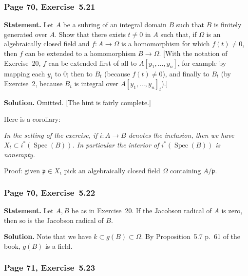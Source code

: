 \documentclass[12pt,letterpaper]{article}%
\newcommand{\oo}{\operatorname}\newcommand{\ooo}{\operatorname*}
\newcommand{\mf}{\mathfrak}
\newcommand{\mmm}{\mf m}
\newcommand{\ppp}{\mf p}
\newcommand{\Spec}{\operatorname{Spec}}\newcommand{\Sp}{\operatorname{Spec}}
\newcommand{\nn}{\noindent}
\begin{document}
\subsubsection{Page 70, Exercise~5.21}\label{ex5.21}%

\textbf{Statement.} Let $A$ be a subring of an integral domain $B$ such that $B$ is finitely generated over $A$. Show that there exists $t\ne0$ in $A$ such that, if $\Omega$ is an algebraically closed field and $f:A\to\Omega$ is a homomorphism for which $f(t)\ne0$, then $f$ can be extended to a homomorphism $B\to\Omega$. [With the notation of Exercise~20, $f$ can be extended first of all to $A[y_1,\ldots,y_n]$, for example by mapping each $y_i$ to $0$; then to $B_t$ (because $f(t)\ne0$), and finally to $B_t$ (by Exercise~2, because $B_t$ is integral over $A[y_1,\ldots,y_n]_t$).]

\nn\textbf{Solution.} Omitted. [The hint is fairly complete.]

Here is a corollary:

\nn\emph{In the setting of the exercise, if $i:A\to B$ denotes the inclusion, then we have $X_t\subset i^*(\Spec(B))$. In particular the interior of $i^*(\Spec(B))$ is nonempty.} 

\nn Proof: given $\ppp\in X_t$ pick an algebraically closed field $\Omega$ containing $A/\ppp$.

\subsubsection{Page 70, Exercise~5.22}\label{ex5.22}%

\textbf{Statement.} Let $A,B$ be as in Exercise~20. If the Jacobson radical of $A$ is zero, then so is the Jacobson radical of $B$.\\ 
\nn[Let $v\ne0$ be an element of $B$. We have to show that there is a maximal ideal of $B$ which does not contain $v$. By applying Exercise~21 to the ring $B_v$ and its subring $A$, we obtain an element $t\ne0$ in $A$. Let $\mmm$ be a maximal ideal of $A$ such that $t\notin\mmm$, and let $k=A/\mmm$. Then the canonical mapping $A\to k$ extends to a homomorphism $g$ of $B_v$ into an algebraic closure $\Omega$ of $k$. Show that $g(v)\ne0$ and that $\oo{Ker}(g)\cap B$ is a maximal ideal of $B$.]

\nn\textbf{Solution.} Note that we have $k\subset g(B)\subset\Omega$. By Proposition~5.7 p.~61 of the book, $g(B)$ is a field.

\subsubsection{Page 71, Exercise~5.23}%
\end{document}
